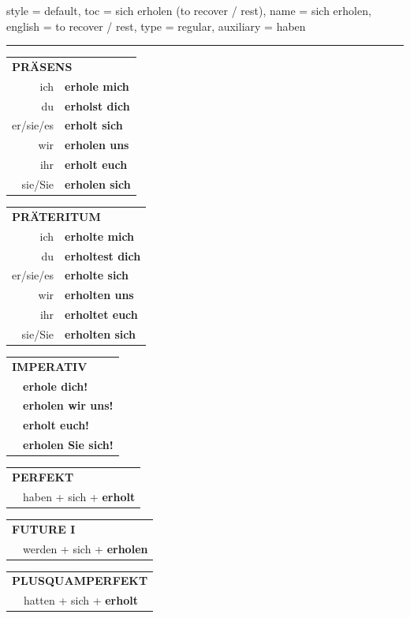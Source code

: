 \begin{verbentry}{
  style = {default},
  toc = {sich erholen (to recover / rest)},
  name = {sich erholen},
  english = {to recover / rest},
  type = {regular},
  auxiliary = {haben}
}


\vspace{5pt}
\hrule
\vspace{5pt}

\begin{tabular}{rl}
\multicolumn{2}{l}{\textbf{PRÄSENS}}\\
ich & \textbf{erhole mich}\\
du & \textbf{erholst dich}\\
er/sie/es & \textbf{erholt sich}\\
wir & \textbf{erholen uns}\\
ihr & \textbf{erholt euch}\\
sie/Sie & \textbf{erholen sich}\\
\end{tabular}
\hfill
\begin{tabular}{rl}
\multicolumn{2}{l}{\textbf{PRÄTERITUM}}\\
ich & \textbf{erholte mich}\\
du & \textbf{erholtest dich}\\
er/sie/es & \textbf{erholte sich}\\
wir & \textbf{erholten uns}\\
ihr & \textbf{erholtet euch}\\
sie/Sie & \textbf{erholten sich}\\
\end{tabular}
\hfill
\begin{tabular}{rl}
\multicolumn{2}{l}{\textbf{IMPERATIV}}\\
& \textbf{erhole dich!}\\
& \textbf{erholen wir uns!}\\
& \textbf{erholt euch!}\\
& \textbf{erholen Sie sich!}\\
\end{tabular}

\vspace{10pt}

\begin{tabular}{rl}
\multicolumn{2}{l}{\textbf{PERFEKT}}\\
& haben + sich + \textbf{erholt}\\
\end{tabular}
\hfill
\begin{tabular}{rl}
\multicolumn{2}{l}{\textbf{FUTURE I}}\\
& werden + sich + \textbf{erholen}\\
\end{tabular}
\hfill
\begin{tabular}{rl}
\multicolumn{2}{l}{\textbf{PLUSQUAMPERFEKT}}\\
& hatten + sich + \textbf{erholt}\\
\end{tabular}


\end{verbentry}
